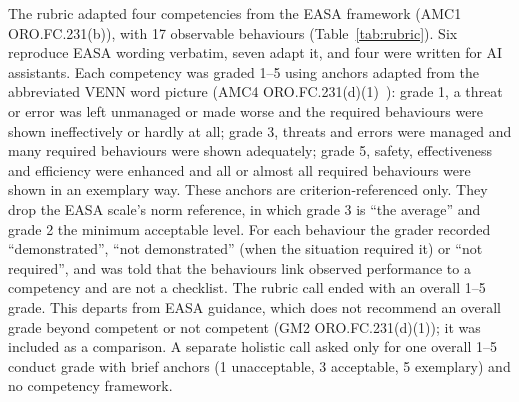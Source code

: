 \documentclass[11pt]{article}
\begin{document}
The rubric adapted four competencies from the EASA framework (AMC1 ORO.FC.231(b)), with 17 observable behaviours (Table~\ref{tab:rubric}). Six reproduce EASA wording verbatim, seven adapt it, and four were written for AI assistants. Each competency was graded 1--5 using anchors adapted from the abbreviated VENN word picture (AMC4 ORO.FC.231(d)(1)~\cite{easa2026ear}): grade 1, a threat or error was left unmanaged or made worse and the required behaviours were shown ineffectively or hardly at all; grade 3, threats and errors were managed and many required behaviours were shown adequately; grade 5, safety, effectiveness and efficiency were enhanced and all or almost all required behaviours were shown in an exemplary way. These anchors are criterion-referenced only. They drop the EASA scale's norm reference, in which grade 3 is ``the average'' and grade 2 the minimum acceptable level. For each behaviour the grader recorded ``demonstrated'', ``not demonstrated'' (when the situation required it) or ``not required'', and was told that the behaviours link observed performance to a competency and are not a checklist. The rubric call ended with an overall 1--5 grade. This departs from EASA guidance, which does not recommend an overall grade beyond competent or not competent (GM2 ORO.FC.231(d)(1)); it was included as a comparison. A separate holistic call asked only for one overall 1--5 conduct grade with brief anchors (1 unacceptable, 3 acceptable, 5 exemplary) and no competency framework.
\end{document}
